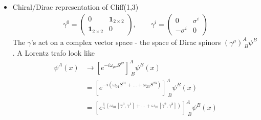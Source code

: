 \documentclass[10pt,a4paper]{book}
\theoremstyle{definition}
\begin{document}
\begin{itemize}
\item Chiral/Dirac representation of Cliff(1,3)
\begin{align}
\gamma^0=\left(\begin{matrix}
0 & \mathbf{1}_{2\times2}\\
\mathbf{1}_{2\times2} & 0
\end{matrix}\right),\qquad
\gamma^i=\left(\begin{matrix}
0 & \sigma^i\\
-\sigma^i & 0
\end{matrix}\right)
\end{align}
The $\gamma$'s act on a complex vector space - the space of Dirac spinors $(\gamma^\mu)^A_{\;B}\psi^B$. A Lorentz trafo look like
\begin{align}
\psi^A(x)&\rightarrow\left[e^{-i\omega_{\rho\sigma}S^{\rho\sigma}}\right]^A_{\;B}\psi^B(x)\\
&=\left[e^{-i(\omega_{01}S^{01}+...+\omega_{23}S^{23})}\right]^A_{\;B}\psi^B(x)\\
&=\left[e^{\frac{1}{4}(\omega_{01}[\gamma^0,\gamma^1]+...+\omega_{23}[\gamma^2,\gamma^3])}\right]^A_{\;B}\psi^B(x)
\end{align}

\end{itemize}
\end{document}
